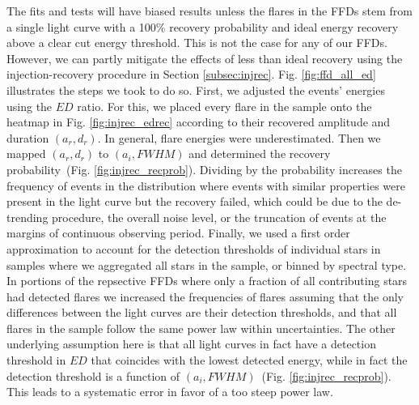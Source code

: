 \documentclass[twocolumn]{aastex62}
\begin{document}
The fits and tests will have biased results unless the flares in the FFDs stem from a single light curve with a 100\% recovery probability and ideal energy recovery above a clear cut energy threshold. This is not the case for any of our FFDs. However, we can partly mitigate the effects of less than ideal recovery using the injection-recovery procedure in Section \ref{subsec:injrec}. Fig. \ref{fig:ffd_all_ed} illustrates the steps we took to do so. First, we adjusted the events' energies using the $ED$ ratio. For this, we placed every flare in the sample onto the heatmap in Fig. \ref{fig:injrec_edrec} according to their recovered amplitude and duration $(a_r,d_r)$. In general, flare energies were underestimated. Then we mapped $(a_r,d_r)$ to $(a_i,FWHM)$ and determined the recovery probability~(Fig. \ref{fig:injrec_recprob}). Dividing by the probability increases the frequency of events in the distribution where events with similar properties were present in the light curve but the recovery failed, which could be due to the de-trending procedure, the overall noise level, or the truncation of events at the margins of continuous observing period. Finally, we used a first order approximation to account for the detection thresholds of individual stars in samples where we aggregated all stars in the sample, or binned by spectral type. In portions of the repsective FFDs where only a fraction of all contributing stars had detected flares we increased the frequencies of flares assuming that the only differences between the light curves are their detection thresholds, and that all flares in the sample follow the same power law within uncertainties. The other underlying assumption here is that all light curves in fact have a detection threshold in $ED$ that coincides with the lowest detected energy, while in fact the detection threshold is a function of $(a_i,FWHM)$~(Fig. \ref{fig:injrec_recprob}). This leads to a systematic error in favor of a too steep power law.
%
%
\end{document}
